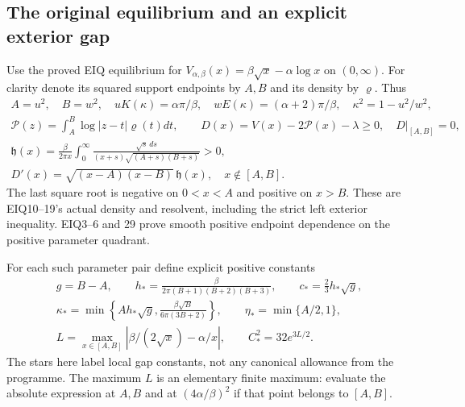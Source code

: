 \documentclass[11pt,a4paper]{article}
\begin{document}
\subsection{The original equilibrium and an explicit exterior gap}
Use the proved EIQ equilibrium for
$V_{\alpha,\beta}(x)=\beta\sqrt x-\alpha\log x$ on $(0,\infty)$.
For clarity denote its squared support endpoints by $A,B$ and its density by $\varrho$.
Thus
\begin{equation}
\begin{gathered}
 A=u^2,\quad B=w^2,\quad
 uK(\kappa)=\alpha\pi/\beta,\quad
 wE(\kappa)=(\alpha+2)\pi/\beta,\quad\kappa^2=1-u^2/w^2,\\
 \mathcal P(z)=\int_A^B\log|z-t|\varrho(t)dt,\qquad
 D(x)=V(x)-2\mathcal P(x)-\lambda\ge0,\quad D|_{[A,B]}=0,\\
 \mathfrak h(x)=\frac{\beta}{2\pi x}\int_0^\infty
   \frac{\sqrt{s}\,ds}{(x+s)\sqrt{(A+s)(B+s)}}>0,\\
 D'(x)=\sqrt{(x-A)(x-B)}\,\mathfrak h(x),\quad x\notin[A,B].
\end{gathered}\label{EOR:eq:EIQ}
\tag{EOR8}
\end{equation}
The last square root is negative on $0<x<A$ and positive on $x>B$.
These are EIQ10--19's actual density and resolvent, including the strict left
exterior inequality. EIQ3--6 and 29 prove smooth positive endpoint dependence
on the positive parameter quadrant.

For each such parameter pair define explicit positive constants
\begin{equation}
\begin{gathered}
 g=B-A,\qquad
 h_* =\frac{\beta}{2\pi(B+1)(B+2)(B+3)},\qquad
 c_* =\frac23h_*\sqrt g,\\
 \kappa_* =\min\left\{A h_*\sqrt g,
               \frac{\beta\sqrt B}{6\pi(3B+2)}\right\},\qquad
 \eta_* =\min\{A/2,1\},\\
 L=\max_{x\in[A,B]}|\beta/(2\sqrt x)-\alpha/x|,
 \qquad C_*^2=32e^{3L/2}.
\end{gathered}\label{EOR:eq:gapconstants}
\tag{EOR9}
\end{equation}
The stars here label local gap constants, not any canonical allowance from the
programme. The maximum $L$ is an elementary finite maximum: evaluate the absolute
expression at $A,B$ and at $(4\alpha/\beta)^2$ if that point belongs to $[A,B]$.
\end{document}
